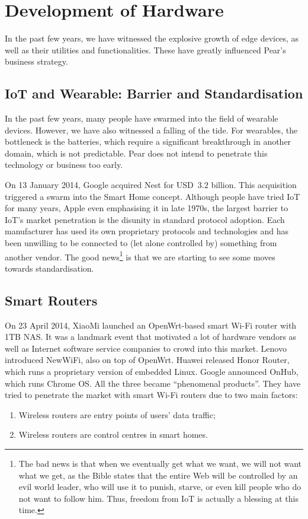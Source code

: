 \section{Development of Hardware}\label{sec-dev-hardware}
In the past few years, we have witnessed the explosive growth of edge devices, as well as their utilities and functionalities. These have greatly influenced Pear's business strategy. 

\subsection{IoT and Wearable: Barrier and Standardisation}
In the past few years, many people have swarmed into the field of wearable devices. However, we have also witnessed a falling of the tide.  
For wearables, the bottleneck is the batteries, which require a significant breakthrough in another domain, which is not predictable. Pear does not intend to penetrate this technology or business too early. 

On 13 January 2014, Google acquired Nest for USD~$3.2$ billion. This acquisition triggered a swarm into the Smart Home concept. Although people have tried IoT for many years, Apple even emphasising it in late 1970s, the largest barrier to IoT's market penetration is the disunity in standard protocol adoption. Each manufacturer has used its own proprietary protocols and technologies and has been unwilling to be connected to (let alone controlled by) something from another vendor. The good news\footnote{The bad news is that when we eventually get what we want, we will not want what we get, as the Bible states that the entire Web will be controlled by an evil world leader, who will use it to punish, starve, or even kill people who do not want to follow him. Thus, freedom from IoT is actually a blessing at this time.} is that we are starting to see some moves towards standardisation. 

\subsection{Smart Routers}\label{sec-smart-routers}
On 23 April 2014, XiaoMi launched an OpenWrt-based smart Wi-Fi router with 1TB NAS. It was a landmark event that motivated a lot of hardware vendors as well as Internet software service companies to crowd into this market. Lenovo introduced NewWiFi, also on top of OpenWrt. Huawei released Honor Router, which runs a proprietary version of embedded Linux. Google announced OnHub, which runs Chrome OS. All the three became ``phenomenal products''. 
They have tried to penetrate the market with smart Wi-Fi routers due to two main factors:
\begin{enumerate}
	\item Wireless routers are entry points of users' data traffic;
	\item Wireless routers are control centres in smart homes.
\end{enumerate}

